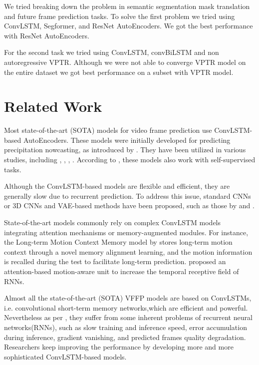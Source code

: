 \documentclass{article}
\begin{document}
We tried breaking down the problem in semantic segmentation mask translation and 
future frame prediction tasks. To solve the first problem we tried using ConvLSTM, 
Segformer, and ResNet AutoEncoders. We got the best performance with ResNet AutoEncoders.

For the second task we tried using ConvLSTM, convBiLSTM and non autoregressive VPTR. Although 
we were not able to converge VPTR model on the entire dataset we got best performance on a subset 
with VPTR model.

\section{Related Work}
Most state-of-the-art (SOTA) models for video frame prediction use ConvLSTM-based AutoEncoders. 
These models were initially developed for predicting precipitation nowcasting, as introduced by 
\citet{Shi2015ConvolutionalLN}. They have been utilized in various studies, including 
\citet{Finn2016UnsupervisedLF}, \citet{Lotter2016DeepPC}, \citet{Xu2016EndtoEndLO}, 
\citet{Ballas2015DelvingDI}. According to \citet{Jing2019SelfSupervisedVF}, these models also 
work with self-supervised tasks.

Although the ConvLSTM-based models are flexible and efficient, they are generally slow due to 
recurrent prediction. To address this issue, standard CNNs or 3D CNNs and VAE-based methods 
have been proposed, such as those by \citet{Mathieu2015DeepMV} and 
\citet{Babaeizadeh2017StochasticVV}.

State-of-the-art models commonly rely on complex ConvLSTM models integrating attention mechanisms 
or memory-augmented modules. For instance, the Long-term Motion Context Memory model by 
\citet{Lee2021VideoPR} stores long-term motion context through a novel memory alignment learning, 
and the motion information is recalled during the test to facilitate long-term prediction. 
\citet{Chang2021MAUAM} proposed an attention-based motion-aware unit to increase the temporal 
receptive field of RNNs.

Almost all the state-of-the-art (SOTA) VFFP models are based on ConvLSTMs, i.e. convolutional 
short-term memory networks,which are efficient and powerful. Nevertheless as per \citet{Ye2022VPTRET}, 
they suffer from some inherent problems of recurrent neural networks(RNNs), such as slow training 
and inference speed, error accumulation during inference, gradient vanishing, and predicted 
frames quality degradation. Researchers keep improving the performance by developing more and 
more sophisticated ConvLSTM-based models. 
\end{document}
